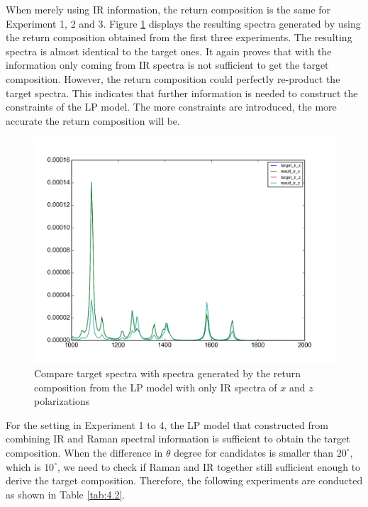 When merely using IR information, the return composition is the same for Experiment 1, 2 and 3. Figure \ref{fig:4.1} displays the resulting spectra generated by using the return composition obtained from the first three experiments. The resulting spectra is almost identical to the target ones. It again proves that with the information only coming from IR spectra is not sufficient to get the target composition.  However, the return composition could perfectly re-product the target spectra. This indicates that further information is needed to construct the constraints of the LP model. The more constraints are introduced, the more accurate the return composition will be. \\
 
\begin{figure}[!ht] \label{fig:4.1}
\centering
\includegraphics[scale=0.5]{Figures/ir_xz_result_plotting.png}
\caption{Compare target spectra with spectra generated by the return composition from the LP model with only IR spectra of $x$ and $z$ polarizations} 
\end{figure}

For the setting in Experiment 1 to 4, the LP model that constructed from combining IR and Raman spectral information is sufficient to obtain the target composition. When the difference in $\theta$ degree for candidates is smaller than $20^{\circ}$, which is $10^{\circ}$, we need to check if Raman and IR together still sufficient enough to derive the target composition. Therefore, the following experiments are conducted as shown in Table \ref{tab:4.2}. \\

